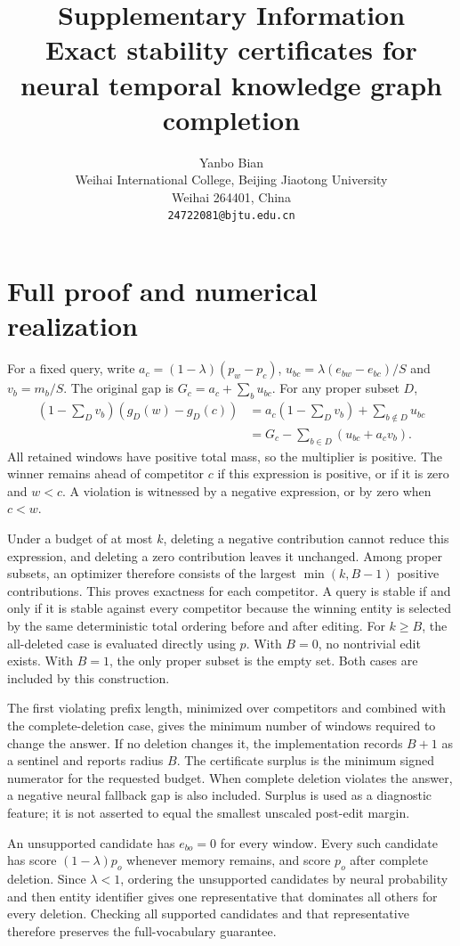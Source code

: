 \documentclass[11pt]{article}
\title{Supplementary Information\\[6pt]\large Exact stability certificates for neural temporal knowledge graph completion}
\author{Yanbo Bian\\Weihai International College, Beijing Jiaotong University\\Weihai 264401, China\\\texttt{24722081@bjtu.edu.cn}}
\date{}
\begin{document}
\maketitle
\section{Full proof and numerical realization}
For a fixed query, write $a_c=(1-\lambda)(p_w-p_c)$,
$u_{bc}=\lambda(e_{bw}-e_{bc})/S$ and $v_b=m_b/S$.
The original gap is $G_c=a_c+\sum_bu_{bc}$. For any proper subset $D$,
\begin{align}
(1-\textstyle\sum_Dv_b)(g_D(w)-g_D(c))
 &=a_c(1-\textstyle\sum_Dv_b)+\textstyle\sum_{b\notin D}u_{bc}\\
 &=G_c-\textstyle\sum_{b\in D}(u_{bc}+a_cv_b).
\end{align}
All retained windows have positive total mass, so the multiplier is positive.
The winner remains ahead of competitor $c$ if this expression is positive,
or if it is zero and $w<c$. A violation is witnessed by a negative expression,
or by zero when $c<w$.

Under a budget of at most $k$, deleting a negative contribution cannot reduce
this expression, and deleting a zero contribution leaves it unchanged.
Among proper subsets, an optimizer therefore consists of the largest
$\min(k,B-1)$ positive contributions. This proves exactness for each competitor.
A query is stable if and only if it is stable against every competitor because
the winning entity is selected by the same deterministic total ordering before
and after editing. For $k\ge B$, the all-deleted case is evaluated directly using
$p$. With $B=0$, no nontrivial edit exists. With $B=1$, the only proper subset is
the empty set. Both cases are included by this construction.

The first violating prefix length, minimized over competitors and combined
with the complete-deletion case, gives the minimum number of windows required
to change the answer. If no deletion changes it, the implementation records
$B+1$ as a sentinel and reports radius $B$. The certificate surplus is the
minimum signed numerator for the requested budget. When complete deletion
violates the answer, a negative neural fallback gap is also included. Surplus
is used as a diagnostic feature; it is not asserted to equal the smallest
unscaled post-edit margin.

An unsupported candidate has $e_{bo}=0$ for every window. Every such candidate
has score $(1-\lambda)p_o$ whenever memory remains, and score $p_o$ after complete
deletion. Since $\lambda<1$, ordering the unsupported candidates by neural
probability and then entity identifier gives one representative that dominates
all others for every deletion. Checking all supported candidates and that
representative therefore preserves the full-vocabulary guarantee.
\end{document}
